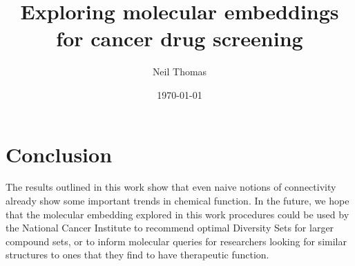 \documentclass{article}
\title{Exploring molecular embeddings for cancer drug screening}
\date{\today}
\author{Neil Thomas}
\begin{document}
\maketitle







\section{Conclusion}

The results outlined in this work show that even naive notions of connectivity already show some important trends in chemical function. In the future, we hope that the molecular embedding explored in this work procedures could be used by the National Cancer Institute to recommend optimal Diversity Sets for larger compound sets, or to inform molecular queries for researchers looking for similar structures to ones that they find to have therapeutic function.

\clearpage
\printbibliography
\end{document}
